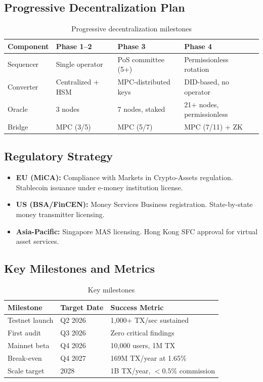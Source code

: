 \documentclass[12pt,a4paper]{article}
\theoremstyle{definition}
\theoremstyle{remark}
\begin{document}
\subsection{Progressive Decentralization Plan}

\begin{table}[H]
\centering
\small
\caption{Progressive decentralization milestones}
\label{tab:decentralization}
\begin{tabular}{L{2.5cm}L{3cm}L{3cm}L{3cm}}
\toprule
\textbf{Component} & \textbf{Phase 1--2} & \textbf{Phase 3} & \textbf{Phase 4} \\
\midrule
Sequencer & Single operator & PoS committee (5+) & Permissionless rotation \\
Converter & Centralized + HSM & MPC-distributed keys & DID-based, no operator \\
Oracle & 3 nodes & 7 nodes, staked & 21+ nodes, permissionless \\
Bridge & MPC (3/5) & MPC (5/7) & MPC (7/11) + ZK \\
\bottomrule
\end{tabular}
\end{table}

\subsection{Regulatory Strategy}

\begin{itemize}[nosep]
    \item \textbf{EU (MiCA):} Compliance with Markets in Crypto-Assets regulation. Stablecoin issuance under e-money institution license.
    \item \textbf{US (BSA/FinCEN):} Money Services Business registration. State-by-state money transmitter licensing.
    \item \textbf{Asia-Pacific:} Singapore MAS licensing. Hong Kong SFC approval for virtual asset services.
\end{itemize}

\subsection{Key Milestones and Metrics}

\begin{table}[H]
\centering
\caption{Key milestones}
\label{tab:milestones}
\begin{tabular}{L{2.5cm}R{2.5cm}L{6cm}}
\toprule
\textbf{Milestone} & \textbf{Target Date} & \textbf{Success Metric} \\
\midrule
Testnet launch & Q2 2026 & 1{,}000+ TX/sec sustained \\
First audit & Q3 2026 & Zero critical findings \\
Mainnet beta & Q4 2026 & 10{,}000 users, 1M TX \\
Break-even & Q4 2027 & 169M TX/year at 1.65\% \\
Scale target & 2028 & 1B TX/year, $< 0.5\%$ commission \\
\bottomrule
\end{tabular}
\end{table}
\end{document}

